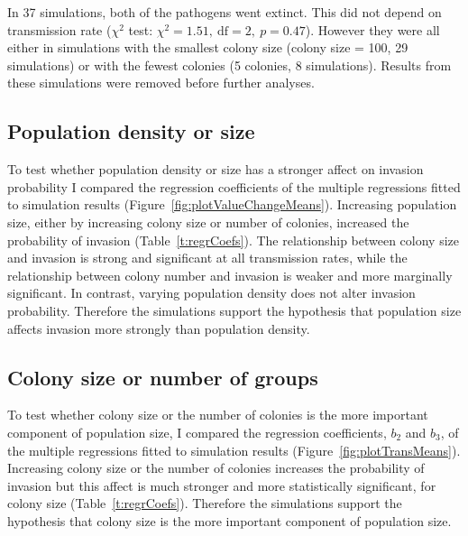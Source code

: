 In 37 simulations, both of the pathogens went extinct.
This did not depend on transmission rate ($\chi^2$ test: $\chi^2 = 1.51,\: \text{df} = 2,\: p = 0.47$).
However they were all either in simulations with the smallest colony size (colony size = 100, 29 simulations) or with the fewest colonies (5 colonies, 8 simulations).
Results from these simulations were removed before further analyses.



\subsection{Population density or size}

To test whether population density or size has a stronger affect on invasion probability I compared the regression coefficients of the multiple regressions fitted to simulation results (Figure~\ref{fig:plotValueChangeMeans}).
Increasing population size, either by increasing colony size or number of colonies, increased the probability of invasion (Table~\ref{t:regrCoefs}).
The relationship between colony size and invasion is strong and significant at all transmission rates, while the relationship between colony number and invasion is weaker and more marginally significant.
In contrast, varying population density does not alter invasion probability.
Therefore the simulations support the hypothesis that population size affects invasion more strongly than population density.


\subsection{Colony size or number of groups}

To test whether colony size or the number of colonies is the more important component of population size, I compared the regression coefficients, $b_2$ and $b_3$, of the multiple regressions fitted to simulation results (Figure~\ref{fig:plotTransMeans}).
Increasing colony size or the number of colonies increases the probability of invasion but this affect is much stronger and more statistically significant, for colony size (Table~\ref{t:regrCoefs}).
Therefore the simulations support the hypothesis that colony size is the more important component of population size.




